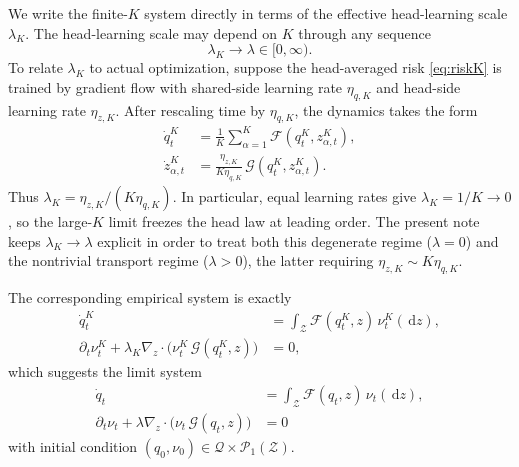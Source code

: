 \documentclass{article}
\theoremstyle{definition}
\newcommand{\PP}{\mathcal{P}}
\newcommand{\dd}{\,\mathrm{d}}
\begin{document}
We write the finite-$K$ system directly in terms of the effective head-learning scale $\lambda_K$. The head-learning scale may depend on $K$ through any sequence
\[
  \lambda_K \to \lambda \in [0,\infty).
\]
To relate $\lambda_K$ to actual optimization, suppose the head-averaged risk \eqref{eq:riskK} is trained by gradient flow with shared-side learning rate $\eta_{q,K}$ and head-side learning rate $\eta_{z,K}$. After rescaling time by $\eta_{q,K}$, the dynamics takes the form
\begin{align}
  \dot q_t^K
  &=
  \frac1K\sum_{\alpha=1}^K \mathcal F(q_t^K,z_{\alpha,t}^K),
  \label{eq:raw-scaled-q}
  \\
  \dot z_{\alpha,t}^K
  &=
  \frac{\eta_{z,K}}{K\eta_{q,K}}\,
  \mathcal G(q_t^K,z_{\alpha,t}^K).
  \label{eq:raw-scaled-z}
\end{align}
Thus $\lambda_K=\eta_{z,K}/(K\eta_{q,K})$. In particular, equal learning rates give $\lambda_K=1/K\to 0$, so the large-$K$ limit freezes the head law at leading order. The present note keeps $\lambda_K\to\lambda$ explicit in order to treat both this degenerate regime ($\lambda=0$) and the nontrivial transport regime ($\lambda>0$), the latter requiring $\eta_{z,K}\sim K\eta_{q,K}$.

The corresponding empirical system is exactly
\begin{align}
  \dot q_t^K
  &=
  \int_{\mathcal Z} \mathcal F(q_t^K,z)\,\nu_t^K(\dd z),
  \label{eq:scaled-q}
  \\
  \partial_t \nu_t^K
  +
  \lambda_K\nabla_z\cdot\bigl(\nu_t^K\,\mathcal G(q_t^K,z)\bigr)
  &=
  0,
  \label{eq:scaled-nu}
\end{align}
which suggests the limit system
\begin{align}
  \dot q_t
  &=
  \int_{\mathcal Z} \mathcal F(q_t,z)\,\nu_t(\dd z),
  \label{eq:limit-q}
  \\
  \partial_t \nu_t
  +
  \lambda\nabla_z\cdot\bigl(\nu_t\,\mathcal G(q_t,z)\bigr)
  &=
  0
  \label{eq:limit-nu}
\end{align}
with initial condition $(q_0,\nu_0)\in\mathcal Q\times\PP_1(\mathcal Z)$.
\end{document}
